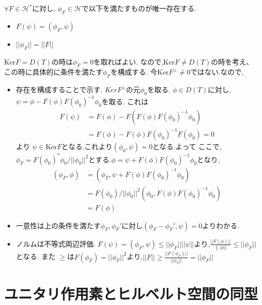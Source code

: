 \documentclass[uplatex]{jsbook}
\begin{document}
\begin{thm}[リースの表現定理]
$\forall F \in \mathcal{H}^*$に対し, $\phi_F \in \mathcal{H}$で以下を満たすものが唯一存在する.
\begin{itemize}
  \item $F(\psi) = (\phi_F, \psi)$
  \item $||\phi_F|| = ||F||$
\end{itemize}
\end{thm}
$\mathrm{Ker}F = D(T)$の時は$\phi_F= 0$を取ればよい.
なので,$\mathrm{Ker}F \neq D(T)$の時を考え、この時に具体的に条件を満たす$\phi_F$を構成する.
今$\mathrm{Ker} F^{\perp} \neq {0}$ではない.なので,
\begin{itemize}
  \item 存在を構成することで示す. $KerF^{\perp}$の元$\phi_0$を取る. $\phi \in D(T)$に対し,$\psi = \phi - F(\phi)F(\phi_0)^{-1}\phi_0 $を取る.
  これは
  \begin{align*}
  F(\psi) & =  F(\phi) - F(F(\phi) F(\phi_0)^{-1}\phi_0)  \\
          & =  F(\phi) - F(\phi)F(\phi_0)^{-1}F(\phi_0)  = 0
  \end{align*}
  より $\psi \in \mathrm{Ker}F$となる.これより$(\phi_0, \psi) =0$となる.よって
  ここで,$\phi_F = F(\phi_0)^* \phi_0 / || \phi_0||^2$とする.$\phi = \psi + F(\phi)F(\phi_0)^{-1} \phi_0$となり,
  \begin{align*}
  (\phi_F, \phi) & = (\phi_F, \psi + F(\phi)F(\phi_0)^{-1} \phi_0)  \\
                 & = F(\phi_0) / || \phi_0||^2 (\phi_0,  F(\phi)F(\phi_0)^{-1} \phi_0) \\
                 & =  F(\phi)
  \end{align*}
 \item 一意性は上の条件を満たす$\phi_F, \phi_F'$に対し$(\phi_F - \phi_F' , \psi) = 0$よりわかる.
 \item  ノルムは不等式両辺評価.
 $F(\psi) = (\phi_F, \psi) \le ||\phi_F|| ||\psi||$より,$\frac{||F(\phi)||}{\||\phi||} \le ||\phi_F||$となる.
 また
 $\ge$は$F(\phi_F) = ||\phi_F||^2$より,$||F|| \ge \frac{||F(\phi_F)||}{||\phi_F||} = ||\phi_F||$
\end{itemize}

\section{ユニタリ作用素とヒルベルト空間の同型}
\end{document}
